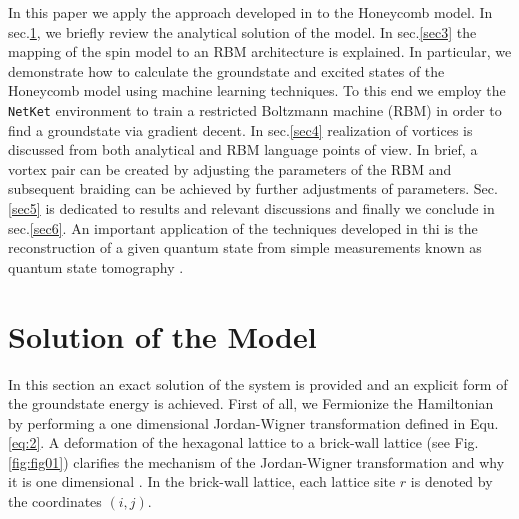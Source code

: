 \documentclass{article}
\begin{document}
In this paper we apply the approach developed in \cite{Deng_2017} to the Honeycomb model. In sec.\hspace{0.2mm}\ref{sec2}, we briefly review the analytical solution of the model. In sec.\hspace{0.2mm}\ref{sec3} the mapping of the spin model to an RBM architecture is explained. In particular, we demonstrate how to calculate the groundstate and excited states of the Honeycomb model using machine learning techniques. To this end we employ the \texttt{NetKet} environment \cite{netket:2019} to train a restricted Boltzmann machine (RBM) in order to find a groundstate via gradient decent. In sec.\hspace{0.2mm}\ref{sec4} realization of vortices is discussed from both analytical and RBM language points of view. In brief, a vortex pair can be created by adjusting the parameters of the RBM and subsequent braiding can be achieved by further adjustments of parameters. Sec.\hspace{0.2mm}\ref{sec5} is dedicated to results and relevant discussions and finally we conclude in sec.\hspace{0.2mm}\ref{sec6}. An important application of the techniques developed in thi is the reconstruction of a given quantum state from simple measurements known as quantum state tomography \cite{Torlai_2018}.






\section{Solution of the Model}\label{sec2}

In this section an exact solution of the system is provided and an explicit form of the groundstate energy is achieved. First of all, we Fermionize the Hamiltonian by performing a one dimensional Jordan-Wigner transformation \cite{Jordan:1928wi} defined in Equ.\hspace{0.2mm}\ref{eq:2}. A deformation of the hexagonal lattice to a brick-wall lattice (see Fig.\hspace{0.2mm}\ref{fig:fig01})  clarifies the mechanism of the Jordan-Wigner transformation and why it is one dimensional \cite{Chen_2008}. In the brick-wall lattice, each lattice site $r$ is denoted by the coordinates $(i,j)$.
\end{document}
